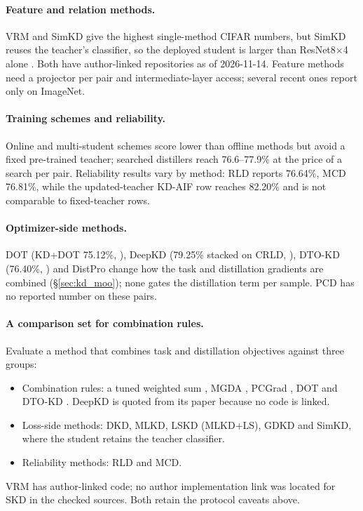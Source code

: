 \paragraph{Feature and relation methods.} VRM and SimKD give the highest single-method CIFAR numbers, but
SimKD reuses the teacher's classifier, so the deployed student is larger than ResNet8$\times$4 alone
\citep{chen2022simkd}. Both have author-linked repositories as of 2026-11-14. Feature methods need a projector per pair and intermediate-layer access; several recent ones report only on ImageNet.

\paragraph{Training schemes and reliability.} Online and multi-student schemes
score lower than offline methods but avoid a fixed pre-trained teacher; searched distillers reach 76.6--77.9\% at the price of a search per pair. Reliability results vary by method: RLD reports 76.64\%, MCD 76.81\%, while the updated-teacher KD-AIF row reaches 82.20\% and is not comparable to fixed-teacher rows.

\paragraph{Optimizer-side methods.} DOT (KD+DOT 75.12\%, \citealp{zhao2023dot}), DeepKD (79.25\% stacked on CRLD, \citealp{huang2025deepkd}), DTO-KD (76.40\%, \citealp{hayder2026dtokd}) and DistPro \citep{deng2022distpro} change how the task and distillation gradients are
combined (\S\ref{sec:kd_moo}); none gates the distillation term per sample. PCD \citep{varam2026pcd} has no reported number on these pairs.

\paragraph{A comparison set for combination rules.} Evaluate a method that combines task and distillation objectives against three groups:
\begin{itemize}
\item Combination rules: a tuned weighted sum \citep{hinton2015kd}, MGDA \citep{sener2018mgda}, PCGrad \citep{yu2020pcgrad}, DOT \citep{zhao2023dot} and DTO-KD \citep{hayder2026dtokd}. DeepKD \citep{huang2025deepkd} is quoted from its paper because no code is linked.
\item Loss-side methods: DKD, MLKD, LSKD (MLKD+LS), GDKD and SimKD, where the student retains the teacher classifier.
\item Reliability methods: RLD and MCD.
\end{itemize}
VRM has author-linked code; no author implementation link was located for SKD in the checked sources. Both retain the protocol caveats above.

